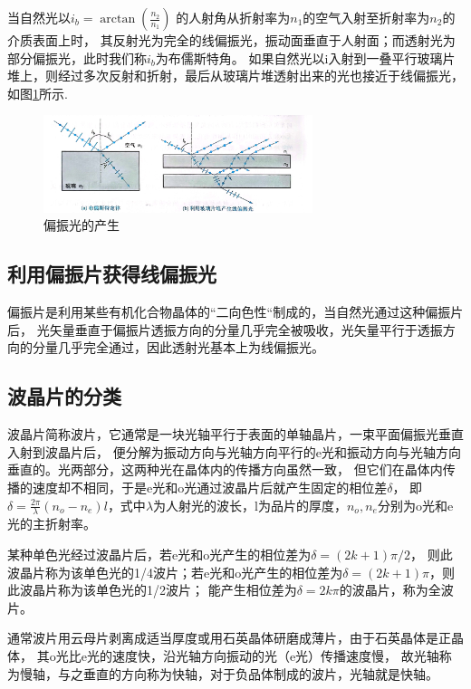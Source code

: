 \documentclass{ctexart}
\begin{document}
  当自然光以$i_{b} = \arctan (\frac{n_{2}}{n_{1}})$
  的人射角从折射率为$n_{1}$的空气入射至折射率为$n_{2}$的介质表面上时，
  其反射光为完全的线偏振光，振动面垂直于人射面；而透射光为部分偏振光，此时我们称$i_{b}$为布儒斯特角。
  如果自然光以i入射到一叠平行玻璃片堆上，则经过多次反射和折射，最后从玻璃片堆透射出来的光也接近于线偏振光，
  如图\ref{pianzhenguangchansheng}所示.

  \begin{figure}[H]\label{pianzhenguangchansheng}
    \centering
    \includegraphics[width=0.7\textwidth,height=0.2\textheight]{pianzhengguangchansheng.jpg}
    \caption{偏振光的产生}
  \end{figure}

  \subsection{利用偏振片获得线偏振光}
  偏振片是利用某些有机化合物晶体的“二向色性“制成的，当自然光通过这种偏振片后，
  光矢量垂直于偏振片透振方向的分量几乎完全被吸收，光矢量平行于透振方向的分量几乎完全通过，因此透射光基本上为线偏振光。

  \subsection{波晶片的分类}
  波晶片简称波片，它通常是一块光轴平行于表面的单轴晶片，一束平面偏振光垂直入射到波晶片后，
  便分解为振动方向与光轴方向平行的e光和振动方向与光轴方向垂直的。光两部分，这两种光在晶体内的传播方向虽然一致，
  但它们在晶体内传播的速度却不相同，于是e光和o光通过波晶片后就产生固定的相位差$\delta$，
  即$\delta = \frac{2\pi}{\lambda} (n_{o} - n_{e}) l$，式中$\lambda$为人射光的波长，l为品片的厚度，$n_{o},n_{e}$分别为o光和e光的主折射率。

  某种单色光经过波晶片后，若e光和o光产生的相位差为$\delta=(2k+1)\pi/2$，
  则此波晶片称为该单色光的1/4波片；若e光和o光产生的相位差为$\delta=(2k+1)\pi$，则此波晶片称为该单色光的1/2波片；
  能产生相位差为$\delta=2k\pi$的波晶片，称为全波片。

  通常波片用云母片剥离成适当厚度或用石英晶体研磨成薄片，由于石英晶体是正晶体，
  其o光比e光的速度快，沿光轴方向振动的光（e光）传播速度慢，
  故光轴称为慢轴，与之垂直的方向称为快轴，对于负品体制成的波片，光轴就是快轴。
\end{document}
